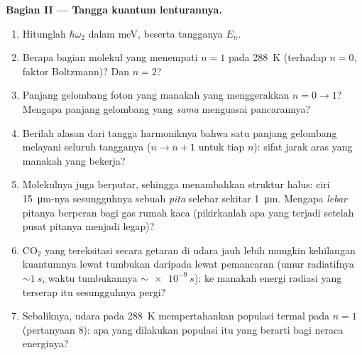 \begin{problem}
\medskip\noindent\textbf{Bagian II --- Tangga kuantum lenturannya.}
\begin{enumerate}[resume]
  \item Hitunglah $\hbar\omega_2$ dalam meV, beserta tangganya $E_n$.
  \item Berapa bagian molekul yang menempati $n = 1$ pada
        \qty{288}{K} (terhadap $n = 0$, faktor Boltzmann)? Dan
        $n = 2$?
  \item Panjang gelombang foton yang manakah yang menggerakkan
        $n = 0 \to 1$? Mengapa panjang gelombang yang \emph{sama}
        menguasai pancarannya?
  \item Berilah alasan dari tangga harmoniknya bahwa satu panjang
        gelombang melayani seluruh tangganya ($n \to n + 1$ untuk tiap
        $n$): sifat jarak aras yang manakah yang bekerja?
  \item Molekulnya juga berputar, sehingga menambahkan struktur halus:
        ciri \qty{15}{\micro m}-nya sesungguhnya sebuah \emph{pita}
        selebar sekitar \qty{1}{\micro m}. Mengapa \emph{lebar} pitanya
        berperan bagi gas rumah kaca (pikirkanlah apa yang terjadi
        setelah pusat pitanya menjadi legap)?
  \item CO$_2$ yang tereksitasi secara getaran di udara jauh lebih
        mungkin kehilangan kuantumnya lewat tumbukan daripada lewat
        pemancaran (umur radiatifnya $\sim\qty{1}{s}$, waktu tumbukannya
        $\sim\qty{e-9}{s}$): ke manakah energi radiasi yang terserap itu
        sesungguhnya pergi?
  \item Sebaliknya, udara pada \qty{288}{K} mempertahankan populasi
        termal pada $n = 1$ (pertanyaan 8): apa yang dilakukan populasi
        itu yang berarti bagi neraca energinya?
\end{enumerate}


\end{problem}
